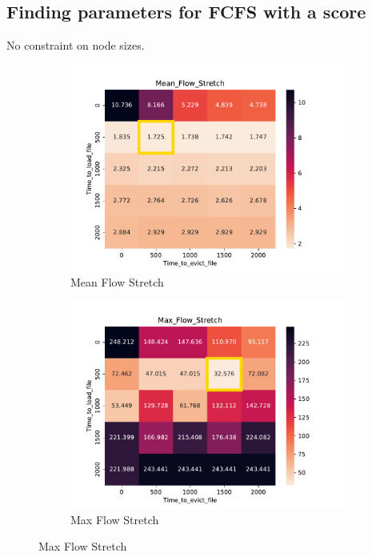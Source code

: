 \documentclass[a4paper]{article}
\begin{document}
\subsection{Finding parameters for FCFS with a score}

No constraint on node sizes.

\begin{figure}[H]\centering
\begin{subfigure}[b]{0.4\linewidth}\centering\includegraphics[width=1\linewidth]{MBSS/plot/Heatmap_Stretch_FCFS_Score_Time_to_load_file_Time_to_evict_file_2022-01-24->2022-01-24_450_128_32_256_4_1024.pdf}\caption{Mean Flow Stretch}\end{subfigure}
\begin{subfigure}[b]{0.4\linewidth}\centering\includegraphics[width=1\linewidth]{MBSS/plot/Heatmap_Max_Stretch_FCFS_Score_Time_to_load_file_Time_to_evict_file_2022-01-24->2022-01-24_450_128_32_256_4_1024.pdf}\caption{Max Flow Stretch}\end{subfigure}

\end{figure}
\end{document}
